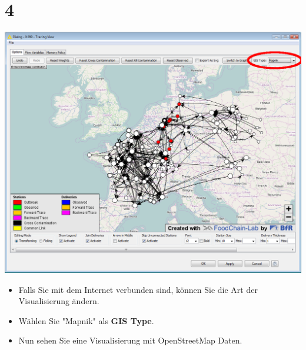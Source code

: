 \documentclass{beamer}
\begin{document}
\section{4}
\begin{frame}
	\begin{center}
  		\includegraphics[height=0.6\textheight]{4.png}
	\end{center}
	\begin{itemize}
		\item Falls Sie mit dem Internet verbunden sind, können Sie die Art der Visualisierung ändern.
		\item Wählen Sie "Mapnik" als \textbf{GIS Type}.
		\item Nun sehen Sie eine Visualisierung mit OpenStreetMap Daten.
	\end{itemize}
\end{frame}
\end{document}
